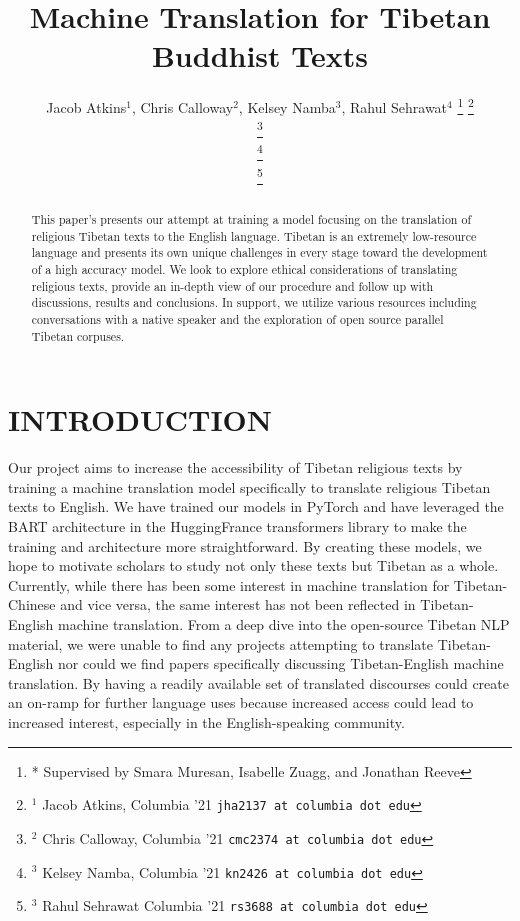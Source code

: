 \documentclass[letterpaper, 12 pt, conference]{ieeeconf}  %
\title{\LARGE \bf
Machine Translation for Tibetan Buddhist Texts
}
\author{ Jacob Atkins$^{1}$, Chris Calloway$^{2}$, Kelsey Namba$^{3}$, Rahul Sehrawat$^{4}$%
\thanks{* Supervised by Smara Muresan, Isabelle Zuagg, and Jonathan Reeve}%
\thanks{$^{1}$ Jacob Atkins, Columbia '21
        {\tt\small jha2137 at columbia dot edu}}%
        
\thanks{$^{2}$ Chris Calloway, Columbia '21
        {\tt\small cmc2374 at columbia dot edu}}%
        
\thanks{$^{3}$ Kelsey Namba, Columbia '21
        {\tt\small kn2426 at columbia dot edu}}%
        
        
\thanks{$^{3}$ Rahul Sehrawat Columbia '21
        {\tt\small rs3688 at columbia dot edu}}%





}
\begin{document}
\maketitle
\thispagestyle{empty}
\pagestyle{empty}


\begin{abstract}

This paper’s presents our attempt at training a model focusing on the translation of religious Tibetan texts to the English language. Tibetan is an extremely low-resource language and presents its own unique challenges in every stage toward the development of a high accuracy model. We look to explore ethical considerations of translating religious texts, provide an in-depth view of our procedure and follow up with discussions, results and conclusions. In support, we utilize various resources including conversations with a native speaker and the exploration of open source parallel Tibetan corpuses.



\end{abstract}


\section{INTRODUCTION}

Our project aims to increase the accessibility of Tibetan religious texts by training a machine translation model specifically to translate religious Tibetan texts to English. We have trained our models in PyTorch and have leveraged the BART architecture in the HuggingFrance transformers library to make the training and architecture more straightforward. By creating these models, we hope to motivate scholars to study not only these texts but Tibetan as a whole. Currently, while there has been some interest in machine translation for Tibetan-Chinese and vice versa, the same interest has not been reflected in Tibetan-English machine translation. From a deep dive into the open-source Tibetan NLP material, we were unable to find any projects attempting to translate Tibetan-English nor could we find papers specifically discussing Tibetan-English machine translation. By having a readily available set of translated discourses could create an on-ramp for further language uses because increased access could lead to increased interest, especially in the English-speaking community.
\end{document}
